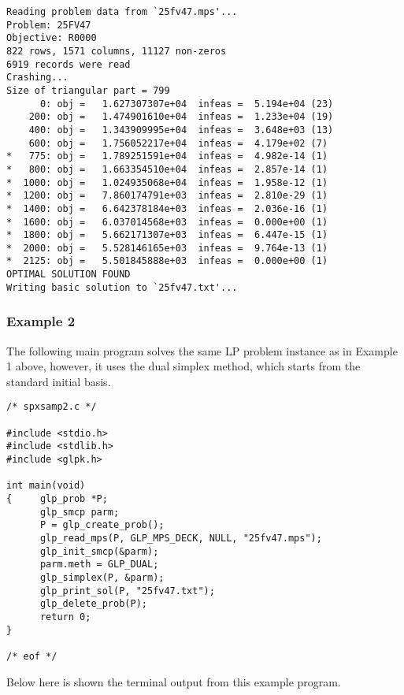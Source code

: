 \begin{footnotesize}
\begin{verbatim}
Reading problem data from `25fv47.mps'...
Problem: 25FV47
Objective: R0000
822 rows, 1571 columns, 11127 non-zeros
6919 records were read
Crashing...
Size of triangular part = 799
      0: obj =   1.627307307e+04  infeas =  5.194e+04 (23)
    200: obj =   1.474901610e+04  infeas =  1.233e+04 (19)
    400: obj =   1.343909995e+04  infeas =  3.648e+03 (13)
    600: obj =   1.756052217e+04  infeas =  4.179e+02 (7)
*   775: obj =   1.789251591e+04  infeas =  4.982e-14 (1)
*   800: obj =   1.663354510e+04  infeas =  2.857e-14 (1)
*  1000: obj =   1.024935068e+04  infeas =  1.958e-12 (1)
*  1200: obj =   7.860174791e+03  infeas =  2.810e-29 (1)
*  1400: obj =   6.642378184e+03  infeas =  2.036e-16 (1)
*  1600: obj =   6.037014568e+03  infeas =  0.000e+00 (1)
*  1800: obj =   5.662171307e+03  infeas =  6.447e-15 (1)
*  2000: obj =   5.528146165e+03  infeas =  9.764e-13 (1)
*  2125: obj =   5.501845888e+03  infeas =  0.000e+00 (1)
OPTIMAL SOLUTION FOUND
Writing basic solution to `25fv47.txt'...
\end{verbatim}
\end{footnotesize}

\newpage

\subsubsection*{Example 2}

The following main program solves the same LP problem instance as in
Example 1 above, however, it uses the dual simplex method, which starts
from the standard initial basis.

\begin{footnotesize}
\begin{verbatim}
/* spxsamp2.c */

#include <stdio.h>
#include <stdlib.h>
#include <glpk.h>

int main(void)
{     glp_prob *P;
      glp_smcp parm;
      P = glp_create_prob();
      glp_read_mps(P, GLP_MPS_DECK, NULL, "25fv47.mps");
      glp_init_smcp(&parm);
      parm.meth = GLP_DUAL;
      glp_simplex(P, &parm);
      glp_print_sol(P, "25fv47.txt");
      glp_delete_prob(P);
      return 0;
}

/* eof */
\end{verbatim}
\end{footnotesize}

\noindent
Below here is shown the terminal output from this example program.

